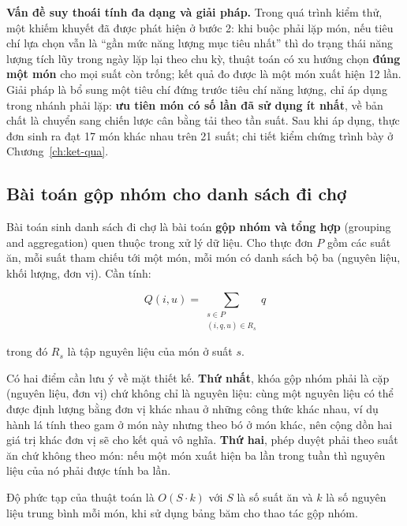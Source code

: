\textbf{Vấn đề suy thoái tính đa dạng và giải pháp.} Trong quá trình kiểm thử,
một khiếm khuyết đã được phát hiện ở bước 2: khi buộc phải lặp món, nếu tiêu chí
lựa chọn vẫn là ``gần mức năng lượng mục tiêu nhất'' thì do trạng thái năng
lượng tích lũy trong ngày lặp lại theo chu kỳ, thuật toán có xu hướng chọn
\textbf{đúng một món} cho mọi suất còn trống; kết quả đo được là một món xuất
hiện 12 lần. Giải pháp là bổ sung một tiêu chí đứng trước tiêu chí năng lượng,
chỉ áp dụng trong nhánh phải lặp: \textbf{ưu tiên món có số lần đã sử dụng ít
nhất}, về bản chất là chuyển sang chiến lược cân bằng tải theo tần suất. Sau khi
áp dụng, thực đơn sinh ra đạt 17 món khác nhau trên 21 suất; chi tiết kiểm chứng
trình bày ở Chương~\ref{ch:ket-qua}.

\subsection{Bài toán gộp nhóm cho danh sách đi chợ}
\label{sec:gop-nhom}

Bài toán sinh danh sách đi chợ là bài toán \textbf{gộp nhóm và tổng hợp}
(grouping and aggregation) quen thuộc trong xử lý dữ liệu. Cho thực đơn $P$ gồm
các suất ăn, mỗi suất tham chiếu tới một món, mỗi món có danh sách bộ ba (nguyên
liệu, khối lượng, đơn vị). Cần tính:

\begin{equation}
Q(i, u) = \sum_{\substack{s \in P \\ (i, q, u) \in R_s}} q
\label{eq:gop-nhom}
\end{equation}

trong đó $R_s$ là tập nguyên liệu của món ở suất $s$.

Có hai điểm cần lưu ý về mặt thiết kế. \textbf{Thứ nhất}, khóa gộp nhóm phải là
cặp (nguyên liệu, đơn vị) chứ không chỉ là nguyên liệu: cùng một nguyên liệu có
thể được định lượng bằng đơn vị khác nhau ở những công thức khác nhau, ví dụ
hành lá tính theo gam ở món này nhưng theo bó ở món khác, nên cộng dồn hai giá
trị khác đơn vị sẽ cho kết quả vô nghĩa. \textbf{Thứ hai}, phép duyệt phải theo
suất ăn chứ không theo món: nếu một món xuất hiện ba lần trong tuần thì nguyên
liệu của nó phải được tính ba lần.

Độ phức tạp của thuật toán là $O(S \cdot k)$ với $S$ là số suất ăn và $k$ là số
nguyên liệu trung bình mỗi món, khi sử dụng bảng băm cho thao tác gộp nhóm.
